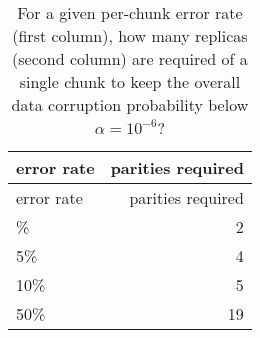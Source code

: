 \hypertarget{tbl:single-chunk}{}
\begin{longtable}[]{@{}lr@{}}
\caption{\label{tbl:single-chunk}For a given per-chunk error rate (first
column), how many replicas (second column) are required of a single
chunk to keep the overall data corruption probability below
\(\alpha = 10^{-6}\)?}\tabularnewline
\toprule\noalign{}
error rate & parities required \\
\midrule\noalign{}
\endfirsthead
\toprule\noalign{}
error rate & parities required \\
\midrule\noalign{}
\endhead
\bottomrule\noalign{}
\endlastfoot
1\% & 2 \\
5\% & 4 \\
10\% & 5 \\
50\% & 19 \\
\end{longtable}



% 
